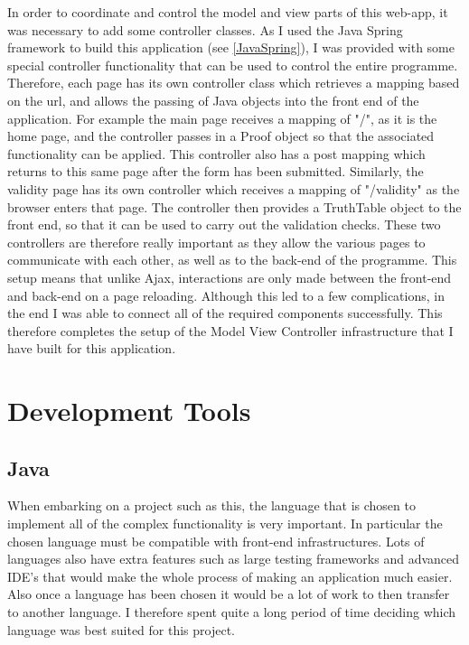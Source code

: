 In order to coordinate and control the model and view parts of this web-app, it was necessary to add some controller classes. As I used the Java Spring framework to build this application (see \ref{JavaSpring}), I was provided with some special controller functionality that can be used to control the entire programme. Therefore, each page has its own controller class which retrieves a mapping based on the url, and allows the passing of Java objects into the front end of the application. For example the main page receives a mapping of "/", as it is the home page, and the controller passes in a Proof object so that the associated functionality can be applied. This controller also has a post mapping which returns to this same page after the form has been submitted. Similarly, the validity page has its own controller which receives a mapping of "/validity" as the browser enters that page. The controller then provides a TruthTable object to the front end, so that it can be used to carry out the validation checks. These two controllers are therefore really important as they allow the various pages to communicate with each other, as well as to the back-end of the programme. This setup means that unlike Ajax, interactions are only made between the front-end and back-end on a page reloading. Although this led to a few complications, in the end I was able to connect all of the required components successfully. This therefore completes the setup of the Model View Controller infrastructure that I have built for this application.

\pagebreak

\section{Development Tools}

\subsection{Java}

When embarking on a project such as this, the language that is chosen to implement all of the complex functionality is very important. In particular the chosen language must be compatible with front-end infrastructures. Lots of languages also have extra features such as large testing frameworks and advanced IDE's that would make the whole process of making an application much easier. Also once a language has been chosen it would be a lot of work to then transfer to another language. I therefore spent quite a long period of time deciding which language was best suited for this project.

